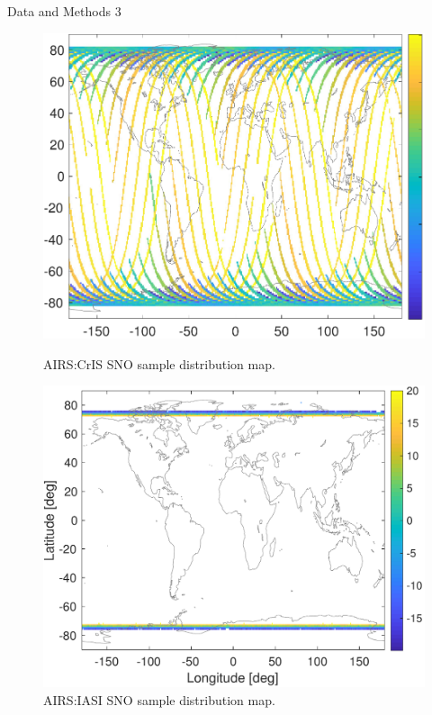 \documentclass[10pt,t]{beamer}
\begin{document}
\begin{frame}{Data and Methods 3}

\begin{figure}[!tbp]
  \centering
  \begin{minipage}[b]{0.45\textwidth}
    \includegraphics[width=\textwidth]{./Figs/ac_global_delay_map.pdf}
    \caption{AIRS:CrIS SNO sample distribution map.}
  \end{minipage}
  \hfill
  \begin{minipage}[b]{0.45\textwidth}
    \includegraphics[width=\textwidth]{./Figs/ai_global_delay_map.pdf}
    \caption{AIRS:IASI SNO sample distribution map.}
  \end{minipage}
\end{figure}


\end{frame}
\end{document}
